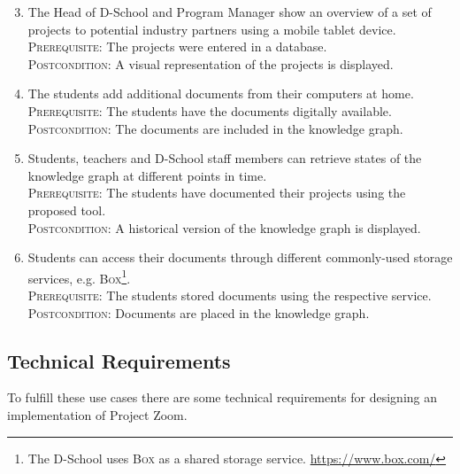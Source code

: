 \begin{enumerate}
\setcounter{enumi}{2}

\item The Head of D-School and Program Manager show an overview of a set of projects to potential industry partners using a mobile tablet device.\\
\textsc{Prerequisite}: The projects were entered in a database.\\
\textsc{Postcondition}: A visual representation of the projects is displayed. \label{uc:3}

\item The students add additional documents from their computers at home.\\
\textsc{Prerequisite}: The students have the documents digitally available.\\
\textsc{Postcondition}: The documents are included in the knowledge graph. \label{uc:4}

\item Students, teachers and D-School staff members can retrieve states of the knowledge graph at different points in time.\\
\textsc{Prerequisite}: The students have documented their projects using the proposed tool.\\
\textsc{Postcondition}: A historical version of the knowledge graph is displayed.  \label{uc:5}

\item Students can access their documents through different commonly-used storage services, e.g. \textsc{Box}\footnote{The D-School uses \textsc{Box} as a shared storage service. \url{https://www.box.com/}}.\\
\textsc{Prerequisite}: The students stored documents using the respective service.\\
\textsc{Postcondition}: Documents are placed in the knowledge graph.  \label{uc:6}
\end{enumerate}

\subsection{Technical Requirements}

To fulfill these use cases there are some technical requirements for designing an implementation of Project Zoom.

